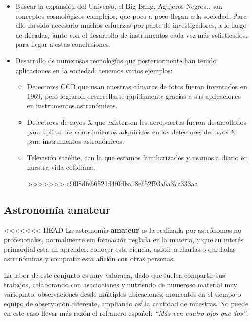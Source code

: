\begin{itemize}
\begin{itemize}
\begin{itemize}
	\item Buscar la expansión del Universo, el Big Bang, Agujeros Negros.. son conceptos cosmológicos complejos, que poco a poco  llegan a la sociedad. Para ello ha sido necesario  muchos esfuerzos por parte de investigadores, a lo largo de décadas, junto con el desarrollo de instrumentos cada vez más sofisticados, para llegar a estas conclusiones. 

	\item Desarrollo de numerosas tecnologías que posteriormente han tenido aplicaciones en la sociedad, tenemos varios ejemplos:   \cite{beneficiosastro2}
	
	
	\begin{itemize}
		\item Detectores CCD que usan nuestras cámaras de fotos fueron inventados en 1969, pero lograron desarrollarse rápidamente gracias a sus aplicaciones en instrumentos astronómicos.
		
		\item Detectores de  rayos X que existen en los aeropuertos fueron desarrollados  para aplicar los  conocimientos  adquiridos en los detectores de rayos X para instrumentos astronómicos. 
		
		\item Televisión satélite, con la que estamos familiarizados y usamos a diario en nuestra vida cotidiana. 
		
>>>>>>> c9f08dfe66521d4f0dba18e652f93a6a37a333aa
	\end{itemize}
\end{itemize}


\subsection{Astronomía amateur}

<<<<<<< HEAD
La astronomía \textbf{amateur} es la realizada por astrónomos no profesionales, normalmente sin formación reglada en la materia, y que su interés primordial esta en aprender, conocer esta ciencia, asistir a charlas o quedadas astronómicas y compartir esta afición con otras personas.


La labor de este conjunto es muy valorada, dado que suelen compartir sus trabajos, colaborando con asociaciones y nutriendo de numeroso material muy variopinto: observaciones desde múltiples ubicaciones, momentos en el tiempo o equipo de observación diferente, ampliando así la cantidad de muestras. No puede en este caso llevar más razón el refranero español: \textit{``Más ven cuatro ojos que dos''}.



\end{itemize}
\end{itemize}
